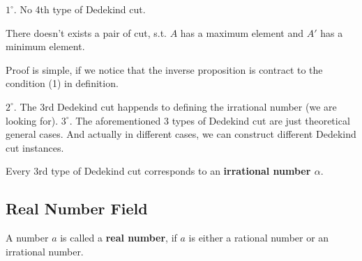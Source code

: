 \documentclass{Math_Note}
\begin{document}
\begin{nt*}
    $1^{\circ}$. No 4th type of Dedekind cut.
    \begin{ssubpro*}
        \begin{minipage}[t]{0.70\textwidth}
        There doesn't exists a pair of cut, s.t. $A$ has a maximum element and $A'$ has a minimum element.
        \end{minipage}
    \end{ssubpro*}
    \begin{ssubpf*}
        \begin{minipage}[t]{0.78\textwidth}
        Proof is simple, if we notice that the inverse proposition is contract to the condition (1) in definition.
        \end{minipage}
    \end{ssubpf*}
    $2^{\circ}$. The 3rd Dedekind cut happends to defining the irrational number (we are looking for).
    $3^{\circ}$. The aforementioned 3 types of Dedekind cut are just theoretical general cases. And actually in different cases,
    we can construct different Dedekind cut instances.
\end{nt*}
\begin{df}
    Every 3rd type of Dedekind cut corresponds to an \textbf{irrational number $\alpha$}.
\end{df}

\subsection{Real Number Field}
\begin{df}
    A number $a$ is called a \textbf{real number}, if $a$ is either a rational number or an irrational number.
\end{df}
\end{document}
